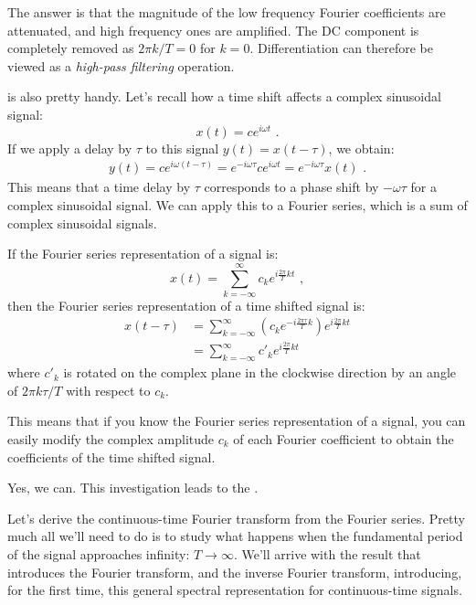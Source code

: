 The answer is that the magnitude of the low frequency Fourier coefficients are attenuated, and
high frequency ones are amplified. The DC component is completely removed as $2\pi k/T = 0$ for $k=0$.
Differentiation can therefore be viewed as a \emph{high-pass filtering} operation.

 is also pretty handy.
Let's recall how a time shift affects a complex sinusoidal signal:
\begin{equation}
  x(t) = c e^{i\omega t} \,\,.
\end{equation}
If we apply a delay by $\tau$ to this signal $y(t) = x(t-\tau)$, we obtain:
\begin{align}
  y(t)  = c e^{i\omega (t-\tau)} =  e^{-i\omega \tau} c e^{i\omega t} = e^{-i\omega \tau} x(t) \,\,.
\end{align}
This means that a time delay by $\tau$ corresponds to a phase shift by $-\omega\tau$ for a complex sinusoidal signal.
We can apply this to a Fourier series, which is a sum of complex sinusoidal signals.

If the Fourier series representation of a signal is:
\begin{equation}
  x(t) = \sum_{k=-\infty}^{\infty} c_k e^{i\frac{2\pi}{T}kt} \,\,,
\end{equation}
then the Fourier series representation of a time shifted signal is:
\begin{align}
  x(t-\tau) & = \sum_{k=-\infty}^{\infty} \left(c_k e^{-i \frac{2\pi \tau}{T} k}\right) e^{i\frac{2\pi}{T}kt}\label{eq:time_shift_phasor} \\
            & =  \sum_{k=-\infty}^{\infty} c'_k e^{i\frac{2\pi}{T}kt}
\end{align}
where $c'_k$ is rotated on the complex plane in the clockwise direction by an angle of $2\pi k\tau/T$ with respect to $c_k$.

This means that if you know the Fourier series representation of a signal, you can easily modify the
complex amplitude $c_k$ of each Fourier coefficient to obtain the coefficients of the time shifted signal.

Yes, we can. This investigation leads to the \emph{}.

Let's derive the continuous-time Fourier transform from the Fourier series. Pretty much all we'll need to do is
to study what happens when the fundamental period of the signal approaches infinity: $T\rightarrow \infty$.
We'll arrive with the result that introduces the Fourier transform, and the inverse Fourier transform, 
introducing, for the first time, this general spectral representation for continuous-time signals.


